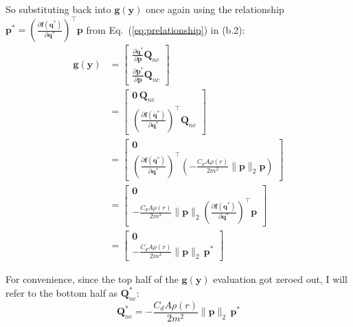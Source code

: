 \documentclass[titlepage]{article}
\begin{document}
So substituting back into $\boldsymbol{g}(\boldsymbol{y})$ once again using the relationship $\boldsymbol{p}^*=\left(\frac{\partial\boldsymbol{f}(\boldsymbol{q}^*)}{\partial\boldsymbol{q}^*}\right)^\top\boldsymbol{p}$ from Eq.~(\ref{eq:prelationship}) in (b.2):
\begin{equation}
	\begin{split}
		\boldsymbol{g}(\boldsymbol{y})&=
		\begin{bmatrix}
			\frac{\partial\boldsymbol{q}^*}{\partial\boldsymbol{p}}\boldsymbol{Q}_{nc} \\
			\frac{\partial\boldsymbol{p}^*}{\partial\boldsymbol{p}}\boldsymbol{Q}_{nc}
		\end{bmatrix} \\
		&=
		\begin{bmatrix}
			\boldsymbol{0}\,\boldsymbol{Q}_{nc} \\
			\left(\frac{\partial\boldsymbol{f}(\boldsymbol{q}^*)}{\partial\boldsymbol{q}^*}\right)^\top\boldsymbol{Q}_{nc}
		\end{bmatrix} \\
		&=
		\begin{bmatrix}
			\boldsymbol{0} \\
			\left(\frac{\partial\boldsymbol{f}(\boldsymbol{q}^*)}{\partial\boldsymbol{q}^*}\right)^\top\left(-\frac{C_dA\rho(r)}{2m^2}\|\boldsymbol{p}\|_2\boldsymbol{p}\right)
		\end{bmatrix} \\
		&=
		\begin{bmatrix}
			\boldsymbol{0} \\
			-\frac{C_dA\rho(r)}{2m^2}\|\boldsymbol{p}\|_2\left(\frac{\partial\boldsymbol{f}(\boldsymbol{q}^*)}{\partial\boldsymbol{q}^*}\right)^\top\boldsymbol{p}
		\end{bmatrix} \\
		&=
		\begin{bmatrix}
			\boldsymbol{0} \\
			-\frac{C_dA\rho(r)}{2m^2}\|\boldsymbol{p}\|_2\,\boldsymbol{p}^*
		\end{bmatrix}
	\end{split}
\end{equation}

For convenience, since the top half of the $\boldsymbol{g}(\boldsymbol{y})$ evaluation got zeroed out, I will refer to the bottom half as $\boldsymbol{Q}_{nc}^*$:
\begin{equation}
	\boldsymbol{Q}_{nc}^*=-\frac{C_dA\rho(r)}{2m^2}\|\boldsymbol{p}\|_2\,\boldsymbol{p}^*
\end{equation}
\end{document}

